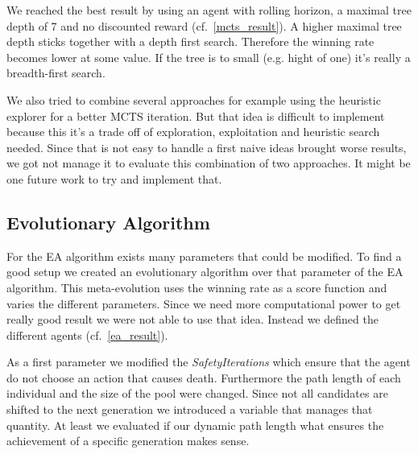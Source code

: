 We reached the best result by using an agent with rolling horizon, a maximal tree depth of 7 
and no discounted reward (cf.~\cref{mcts_result}). 
A higher maximal tree depth sticks together with a depth first search. Therefore the winning rate
becomes lower at some value. If the tree is to small (e.g. hight of one) it's really a breadth-first search.

We also tried to combine several approaches for example using the heuristic explorer 
for a better \ac{MCTS} iteration. But that idea is difficult to implement because this
it's a trade off of exploration, exploitation and heuristic search needed. Since that is
not easy to handle a first naive ideas brought worse results, we got not manage it to evaluate 
this combination of two approaches.
It might be one future work to try and implement that.



\subsection{Evolutionary Algorithm} 

For the \ac{EA} algorithm exists many parameters that could be modified. To find a
good setup we created an evolutionary algorithm over that parameter of the \ac{EA}
algorithm. This meta-evolution uses the winning rate as a score function and
varies the different parameters. Since we need more computational power to
get really good result we were not able to use that idea. Instead we defined
the different agents (cf.~\cref{ea_result}).

As a first parameter we modified the \textit{SafetyIterations} which ensure that the agent do not
choose an action that causes death.
Furthermore the path length of each individual and the size of the pool were changed.
Since not all candidates are shifted to the next generation we introduced a variable
that manages that quantity. At least we evaluated if our dynamic path length what
ensures the achievement of a specific generation makes sense.


